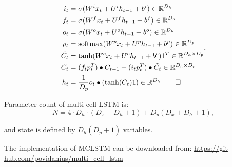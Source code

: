 \documentclass[a4paper,11pt]{article}
\makeatletter
\newcommand{\change@uppercase@math}{%
  \count@=`\A
  \loop
    \mathcode\count@\count@
    \ifnum\count@<`\Z
    \advance\count@\@ne
  \repeat}
\newcommand{\softmax}[1]{
  \mathrm{softmax}(
}
\makeatother
\begin{document}
\begin{align}
\begin{split}
\label{LSTM}
i_{t} &=\sigma(W^{i}x_{t} + U^{i}h_{t-1} + b^{i}) \in \mathbb{R}^{D_{h}}\\
f_{t} &=\sigma(W^{f}x_{t} + U^{f}h_{t-1} + b^{f})\in \mathbb{R}^{D_{h}}\\
o_{t} &=\sigma(W^{o}x_{t} + U^{o}h_{t-1} + b^{o})\in \mathbb{R}^{D_{h}}\\
p_{t} &=\softmax(W^{p}x_{t} + U^{p}h_{t-1} + b^{p}) \in \mathbb{R}^{D_{p}}\\
\tilde{C}_{t} &= \tanh(W^{c}x_{t} + U^{c}h_{t-1} + b^{c})1^{T}\in \mathbb{R}^{D_{h}
\times D_{p}}\\
C_{t} &=(f_{t} p_{t}^{T}) \bullet C_{t-1} + (i_{t} p_{t}^{T}) \bullet \tilde{C}_{t}\in \mathbb{R}^{D_{h}\times D_{p}} \\
h_{t} &= \frac{1}{D_{p}} o_{t} \bullet (\tanh(C_{t}) 1) \in \mathbb{R}^{D_{h}}\qedhere
\end{split},
\end{align}

Parameter count of multi cell LSTM is:
\begin{equation}
\label{eq:multi_cell_lstm_parameter_count}
N =  4 \cdot D_{h} \cdot (D_{x}  + D_{h} + 1) + D_{p}(D_{x} + D_{h} + 1),
\end{equation}

and state is defined by $D_{h}(D_{p} + 1)$ variables.

The implementation of MCLSTM can be downloaded from:
\url{https://git hub.com/povidanius/multi_cell_lstm}






\end{document}
